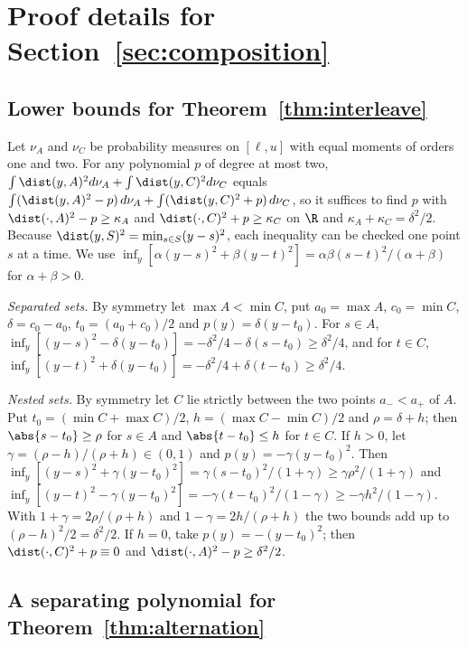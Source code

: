 \section{Proof details for Section~\ref{sec:composition}}\label{app:composition}

\subsection{Lower bounds for Theorem~\ref{thm:interleave}}\label{app:interleave}

Let $\nu_A$ and $\nu_C$ be probability measures on $[\ell,u]$ with equal moments
of orders one and two. For any polynomial $p$ of degree at most two,
$\int\dist(y,A)^2d\nu_A+\int\dist(y,C)^2d\nu_C$ equals
$\int(\dist(y,A)^2-p)\,d\nu_A+\int(\dist(y,C)^2+p)\,d\nu_C$, so it suffices to
find $p$ with $\dist(\cdot,A)^2-p\ge\kappa_A$ and $\dist(\cdot,C)^2+p\ge\kappa_C$ on
$\R$ and $\kappa_A+\kappa_C=\delta^2/2$. Because $\dist(y,S)^2=\min_{s\in S}(y-s)^2$,
each inequality can be checked one point $s$ at a time. We use
$\inf_y[\alpha(y-s)^2+\beta(y-t)^2]=\alpha\beta(s-t)^2/(\alpha+\beta)$ for
$\alpha+\beta>0$.

\emph{Separated sets.} By symmetry let $\max A<\min C$, put $a_0=\max A$,
$c_0=\min C$, $\delta=c_0-a_0$, $t_0=(a_0+c_0)/2$ and $p(y)=\delta(y-t_0)$. For
$s\in A$, $\inf_y[(y-s)^2-\delta(y-t_0)]=-\delta^2/4-\delta(s-t_0)\ge\delta^2/4$, and
for $t\in C$, $\inf_y[(y-t)^2+\delta(y-t_0)]=-\delta^2/4+\delta(t-t_0)\ge\delta^2/4$.

\emph{Nested sets.} By symmetry let $C$ lie strictly between the two points
$a_-<a_+$ of $A$. Put $t_0=(\min C+\max C)/2$, $h=(\max C-\min C)/2$ and
$\rho=\delta+h$; then $\abs{s-t_0}\ge\rho$ for $s\in A$ and $\abs{t-t_0}\le h$ for
$t\in C$. If $h>0$, let $\gamma=(\rho-h)/(\rho+h)\in(0,1)$ and
$p(y)=-\gamma(y-t_0)^2$. Then
$\inf_y[(y-s)^2+\gamma(y-t_0)^2]=\gamma(s-t_0)^2/(1+\gamma)\ge\gamma\rho^2/(1+\gamma)$ and
$\inf_y[(y-t)^2-\gamma(y-t_0)^2]=-\gamma(t-t_0)^2/(1-\gamma)\ge-\gamma h^2/(1-\gamma)$.
With $1+\gamma=2\rho/(\rho+h)$ and $1-\gamma=2h/(\rho+h)$ the two bounds add up to
$(\rho-h)^2/2=\delta^2/2$. If $h=0$, take $p(y)=-(y-t_0)^2$; then
$\dist(\cdot,C)^2+p\equiv0$ and $\dist(\cdot,A)^2-p\ge\delta^2/2$.

\subsection{A separating polynomial for Theorem~\ref{thm:alternation}}\label{app:alternation}

